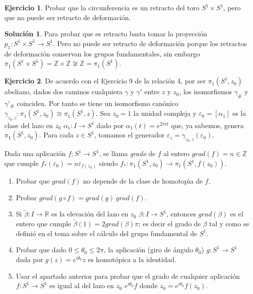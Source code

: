 \documentclass{article}
\theoremstyle{plain}
\theoremstyle{definition}
\newtheorem{exercise}{Ejercicio}
\newtheorem*{sol*}{Solución}
\newcommand{\Z}{\mathbb{Z}}
\begin{document}
\newpage

\begin{exercise} Probar que la circunferencia es un retracto del toro $S^1\times S^1$, pero que no puede ser retracto de deformaci\'on.
\end{exercise}
\begin{sol*}
Para probar que es retracto basta tomar la proyección $p_1:S^1\times S^1\to S^1$. Pero no puede ser retracto de deformación porque los retractos de deformación conservan los grupos fundamentales, sin embargo $\pi_1(S^1\times S^1)=\Z\times\Z\not\cong\Z =\pi_1(S^1)$.
\end{sol*}

\newpage

\begin{exercise} \label{grado1} De acuerdo con el Ejercicio 9 de la relaci\'on 4, por ser $\pi_1(S^1,z_0)$ abeliano, dados dos caminos cualquiera $\gamma$ y  $\gamma'$ entre $z$ y $z_0$, los isomorfismos $\gamma_{\#}$ y $\gamma'_{\#}$ coinciden. Por tanto se tiene un isomorfismo can\'onico $\gamma_{z_0,z}: \pi_1(S^1,z_0) \cong \pi_1(S^1,z)$. Sea $z_0 = 1$ la unidad compleja y $\varepsilon_0 = [\alpha_1]$ es la clase del lazo en $z_0$ $\alpha_1: I \to S^1$ dado por $\alpha_1(t) = e^{2\pi it}$ que, ya sabemos, genera $\pi_1(S^1,z_0)$. Para cada $z\in S^1$, tomamos el generador $\varepsilon_z = \gamma_{z_0,z}(\varepsilon_0)$.
\par
Dada una aplicaci\'on $f: S^1\to S^1$, se llama \emph{grado} de $f$ al entero $grad(f) = n\in \mathbb{Z}$ que cumple $f_*(\varepsilon_0) = n \varepsilon_{f(z_0)}$ siendo $f_*: \pi_1(S^1,z_0) \to \pi_1(S^1,f(z_0))$.
\begin{enumerate}
\item Probar que $grad(f)$ no depende de la clase de homotop\'{\i}a de $f$.
\item Probar $grad(g\circ f) = grad(g) \ grad(f)$.
\item Si $\widetilde{\beta}: I \to \mathbb{R}$ es la elevaci\'on del lazo en $z_0$ $\beta: I \to S^1$, entonces  $grad(\beta)$ es el
entero que cumple $\widetilde{\beta}(1) = 2grad(\beta) \pi$; es decir el grado de $\beta$ tal y como se defini\'o en el tema sobre el c\'alculo del grupo fundamental de $S^1$.
\item Probar que dado $0\leq \theta_0 \leq 2\pi$, la aplicaci\'on (giro de \'angulo $\theta_0$) $g: S^1\to S^1$ dada por $g(z) =  e^{i\theta_0}z$ es homot\'opica a la identidad.
    \item Usar el apartado anterior para probar que el grado de cualquier aplicaci\'on $f: S^1\to S^1$ es igual al del lazo en $z_0$ $e^{i\theta_0}f$ donde $z_0 = e^{i\theta_0} f(z_0)$.
\end{enumerate}
\end{exercise}
\end{document}
